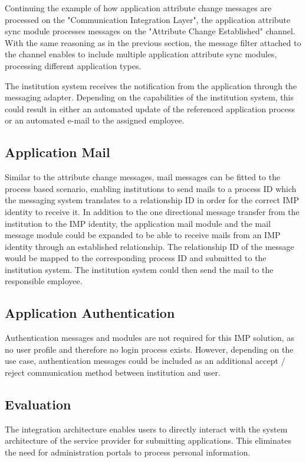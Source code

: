 Continuing the example of how application attribute change messages are processed on the "Communication Integration Layer", the application attribute sync module processes messages on the "Attribute Change Established" channel. With the same reasoning as in the previous section, the message filter attached to the channel enables to include multiple application attribute sync modules, processing different application types.

The institution system receives the notification from the application through the messaging adapter. Depending on the capabilities of the institution system, this could result in either an automated update of the referenced application process or an automated e-mail to the assigned employee.

\subsection{Application Mail}

Similar to the attribute change messages, mail messages can be fitted to the process based scenario, enabling institutions to send mails to a process ID which the messaging system translates to a relationship ID in order for the correct IMP identity to receive it. In addition to the one directional message transfer from the institution to the IMP identity, the application mail module and the mail message module could be expanded to be able to receive mails from an IMP identity through an established relationship. The relationship ID of the message would be mapped to the corresponding process ID and submitted to the institution system. The institution system could then send the mail to the responsible employee.

\subsection{Application Authentication}

Authentication messages and modules are not required for this IMP solution, as no user profile and therefore no login process exists. However, depending on the use case, authentication messages could be included as an additional accept / reject communication method between institution and user.

\subsection{Evaluation}
The integration architecture enables users to directly interact with the system architecture of the service provider for submitting applications. This eliminates the need for administration portals to process personal information.

